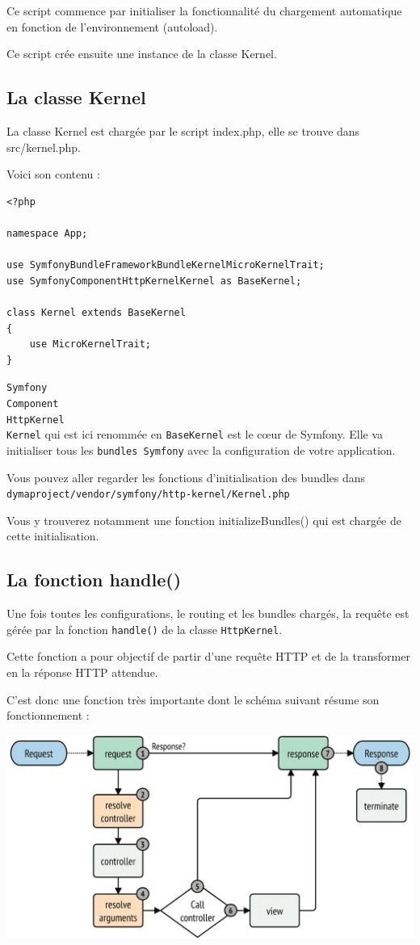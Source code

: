 \documentclass{article}
\begin{document}
Ce script commence par initialiser la fonctionnalité du chargement automatique en fonction de l'environnement (autoload).

Ce script crée ensuite une instance de la classe Kernel.

\subsection{La classe Kernel}
La classe Kernel est chargée par le script index.php, elle se trouve dans src/kernel.php.

Voici son contenu :
\begin{verbatim}
<?php

namespace App;

use SymfonyBundleFrameworkBundleKernelMicroKernelTrait;
use SymfonyComponentHttpKernelKernel as BaseKernel;

class Kernel extends BaseKernel
{
    use MicroKernelTrait;
}
\end{verbatim}

{\tt Symfony\\Component\\HttpKernel\\Kernel} qui est ici renommée en {\tt BaseKernel} est le cœur de Symfony. Elle va initialiser tous les {\tt bundles Symfony} avec la configuration de votre application.

Vous pouvez aller regarder les fonctions d'initialisation des bundles dans {\tt dymaproject/vendor/symfony/http-kernel/Kernel.php}

Vous y trouverez notamment une fonction initializeBundles() qui est chargée de cette initialisation.

\subsection{La fonction handle()}
Une fois toutes les configurations, le routing et les bundles chargés, la requête est gérée par la fonction {\tt handle()} de la classe {\tt HttpKernel}.

Cette fonction a pour objectif de partir d'une requête HTTP et de la transformer en la réponse HTTP attendue.

C'est donc une fonction très importante dont le schéma suivant résume son fonctionnement :
\begin{center}
\includegraphics[width=15cm]{images/image5.png}
\end{center}
\end{document}
